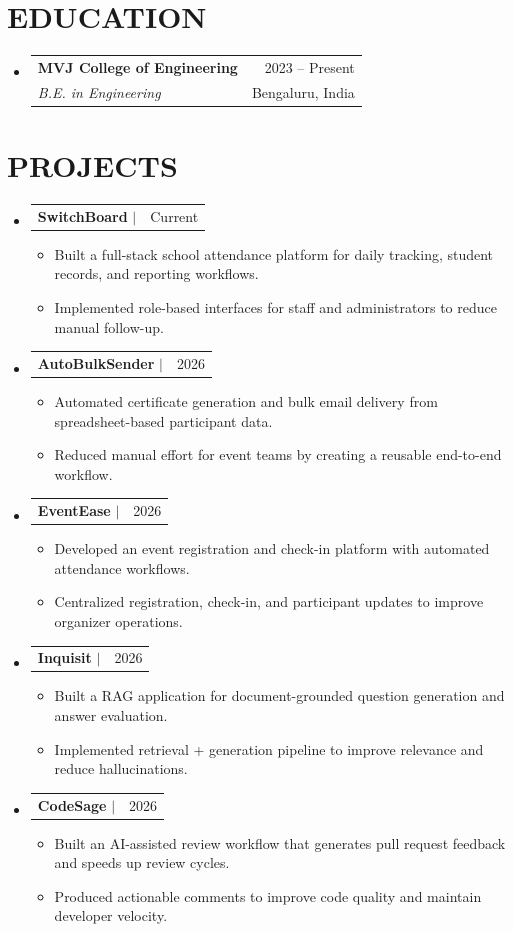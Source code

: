 \documentclass[letterpaper,11pt]{article}
\makeatletter
\newcommand{\myuline}[1]{%
  \uline{\phantom{#1}}%
  \llap{\contour{white}{#1}}%
}
\newcommand{\resumeItem}[1]{
  \item\small{{#1 \vspace{-1pt}}}
}
\newcommand{\resumeSubheading}[4]{
  \vspace{-1pt}\item
    \begin{tabular*}{\textwidth}[t]{l@{\extracolsep{\fill}}r}
      \textbf{#1} & {\color{dark-grey}\small #2}\vspace{1pt}\\
      \textit{#3} & {\color{dark-grey}\small #4}\\
    \end{tabular*}\vspace{-4pt}
}
\newcommand{\resumeProjectHeading}[2]{
  \item
    \begin{tabular*}{\textwidth}{l@{\extracolsep{\fill}}r}
      #1 & {\color{dark-grey}\small #2}\\
    \end{tabular*}\vspace{-4pt}
}
\newcommand{\resumeSubHeadingListStart}{\begin{itemize}[leftmargin=0in, label={}]}
\newcommand{\resumeSubHeadingListEnd}{\end{itemize}}
\newcommand{\resumeItemListStart}{\begin{itemize}}
\newcommand{\resumeItemListEnd}{\end{itemize}\vspace{0pt}}
\makeatother
\begin{document}
\section{EDUCATION}
\resumeSubHeadingListStart
  \resumeSubheading
    {MVJ College of Engineering}{2023 -- Present}
    {B.E. in Engineering}{Bengaluru, India}
\resumeSubHeadingListEnd

\section{PROJECTS}
\resumeSubHeadingListStart
  \resumeProjectHeading
    {\textbf{SwitchBoard} $|$ \href{https://swtich-board.vercel.app/}{\myuline {Live Project}}}{Current}
    \resumeItemListStart
      \resumeItem{Built a full-stack school attendance platform for daily tracking, student records, and reporting workflows.}
      \resumeItem{Implemented role-based interfaces for staff and administrators to reduce manual follow-up.}
    \resumeItemListEnd

  \resumeProjectHeading
    {\textbf{AutoBulkSender} $|$ \href{https://github.com/shravanramakunja/AutoBulkSender}{\myuline {GitHub}}}{2026}
    \resumeItemListStart
      \resumeItem{Automated certificate generation and bulk email delivery from spreadsheet-based participant data.}
      \resumeItem{Reduced manual effort for event teams by creating a reusable end-to-end workflow.}
    \resumeItemListEnd

  \resumeProjectHeading
    {\textbf{EventEase} $|$ \href{https://github.com/shravanramakunja/EventEase}{\myuline {GitHub}}}{2026}
    \resumeItemListStart
      \resumeItem{Developed an event registration and check-in platform with automated attendance workflows.}
      \resumeItem{Centralized registration, check-in, and participant updates to improve organizer operations.}
    \resumeItemListEnd

  \resumeProjectHeading
    {\textbf{Inquisit} $|$ \href{https://github.com/shravanramakunja/Inquisit}{\myuline {GitHub}}}{2026}
    \resumeItemListStart
      \resumeItem{Built a RAG application for document-grounded question generation and answer evaluation.}
      \resumeItem{Implemented retrieval + generation pipeline to improve relevance and reduce hallucinations.}
    \resumeItemListEnd

  \resumeProjectHeading
    {\textbf{CodeSage} $|$ \href{https://github.com/shravanramakunja/CodeSage}{\myuline {GitHub}}}{2026}
    \resumeItemListStart
      \resumeItem{Built an AI-assisted review workflow that generates pull request feedback and speeds up review cycles.}
      \resumeItem{Produced actionable comments to improve code quality and maintain developer velocity.}
    \resumeItemListEnd
\resumeSubHeadingListEnd
\end{document}
